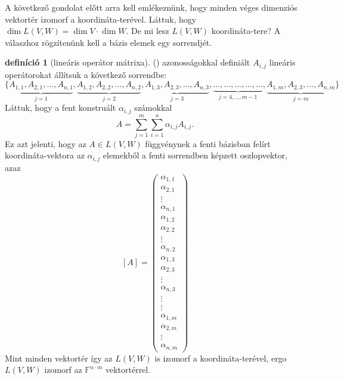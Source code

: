 \documentclass[9pt, showtrims]{memoir}
\let\Aref\relax
\theoremstyle{plain}
\theoremstyle{remark}
\theoremstyle{definition}
\newtheorem{definition}[proposition]{definíció}
\renewcommand{\mathbf}{\mathbb}
\begin{document}
A következő gondolat előtt arra kell emlékeznünk, 
hogy minden véges dimenziós vektortér izomorf a koordináta-terével.
Láttuk, hogy $\dim L\left( V,W \right)=\dim V\cdot\dim W$.
De mi lesz $L\left( V,W \right)$ koordináta-tere?
A válaszhoz rögzítenünk kell a bázis elemek egy sorrendjét.
\begin{definition}[lineáris operátor mátrixa]
    (\Aref{eq:aij}) azonosságokkal definiált $A_{i,j}$ lineáris operátorokat állítsuk a következő sorrendbe:
    \[
    \{ 
        \underbrace{A_{1,1},A_{2,1},\dots,A_{n,1}}_{j=1},
        \underbrace{A_{1,2},A_{2,2},\dots,A_{n,2}}_{j=2},
        \underbrace{A_{1,3},A_{2,3},\dots,A_{n,3}}_{j=3},
        \underbrace{\dots,\dots,\dots,\dots,\dots}_{j=4,\dots,m-1},
        \underbrace{A_{1,m},A_{2,3},\dots,A_{n,m}}_{j=m}
    \}
    \]
    Láttuk, hogy a fent konstruált $\alpha_{i,j}$ számokkal 
    \[
        A=
        \sum_{j=1}^m\sum_{i=1}^n\alpha_{i,j}A_{i,j}.
    \]
    Ez azt jelenti, hogy az $A\in L\left( V,W \right)$ függvénynek a fenti bázisban felírt koordináta-vektora
    az $\alpha_{i,j}$ elemekből a fenti sorrendben képzett oszlopvektor, azaz
    \[
    \left[ A \right]=
    \begin{pmatrix}
        \alpha_{1,1}\\ \alpha_{2,1}\\ \vdots \\ \alpha_{n,1}\\
        \alpha_{1,2}\\ \alpha_{2,2}\\ \vdots \\ \alpha_{n,2}\\
        \alpha_{1,3}\\ \alpha_{2,3}\\ \vdots \\ \alpha_{n,3}\\
        \vdots \\ \vdots\\
        \alpha_{1,m}\\ \alpha_{2,m}\\ \vdots \\ \alpha_{n,m}
    \end{pmatrix}\tag{\dag}
    \]
    Mint minden vektortér így az $L\left( V,W \right)$ is izomorf a koordináta-terével, ergo $L\left( V,W \right)$ izomorf 
    az $\mathbf{F}^{n\cdot m}$ vektortérrel.


\end{definition}
\end{document}

